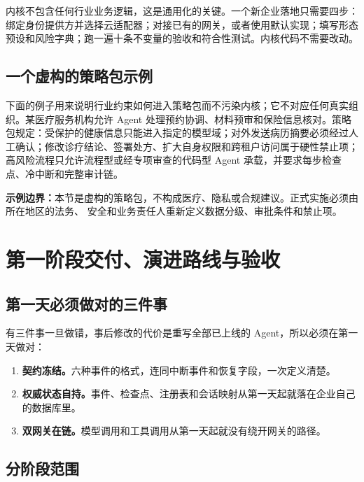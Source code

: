 内核不包含任何行业业务逻辑，这是通用化的关键。一个新企业落地只需要四步：绑定身份提供方并选择云适配器；对接已有的网关，或者使用默认实现；填写形态预设和风险字典；跑一遍十条不变量的验收和符合性测试。内核代码不需要改动。

\subsection{一个虚构的策略包示例}

下面的例子用来说明行业约束如何进入策略包而不污染内核；它不对应任何真实组织。某医疗服务机构允许 Agent 处理预约协调、材料预审和保险信息核对。策略包规定：受保护的健康信息只能进入指定的模型域；对外发送病历摘要必须经过人工确认；修改诊疗结论、签署处方、扩大自身权限和跨租户访问属于硬性禁止项；高风险流程只允许流程型或经专项审查的代码型 Agent 承载，并要求每步检查点、冷中断和完整审计链。

\begin{notebox}
  \textbf{示例边界：}本节是虚构的策略包，不构成医疗、隐私或合规建议。正式实施必须由所在地区的法务、
  安全和业务责任人重新定义数据分级、审批条件和禁止项。
\end{notebox}

\section{第一阶段交付、演进路线与验收}
\label{sec:mvp}

\subsection{第一天必须做对的三件事}

有三件事一旦做错，事后修改的代价是重写全部已上线的 Agent，所以必须在第一天做对：

\begin{enumerate}
  \item \textbf{契约冻结。}六种事件的格式，连同中断事件和恢复字段，一次定义清楚。
  \item \textbf{权威状态自持。}事件、检查点、注册表和会话映射从第一天起就落在企业自己的数据库里。
  \item \textbf{双网关在链。}模型调用和工具调用从第一天起就没有绕开网关的路径。
\end{enumerate}

\subsection{分阶段范围}

